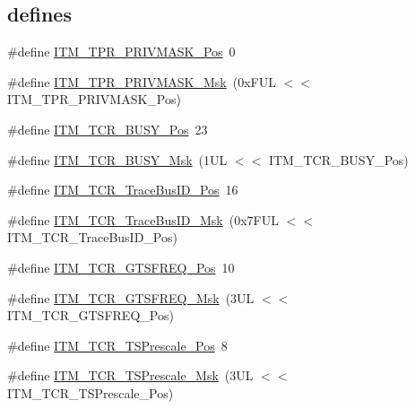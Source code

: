 \subsection*{defines}
\begin{DoxyCompactItemize}
\item 
\#define \mbox{\hyperlink{group___c_m_s_i_s___i_t_m_ga7abe5e590d1611599df87a1884a352e8}{I\+T\+M\+\_\+\+T\+P\+R\+\_\+\+P\+R\+I\+V\+M\+A\+S\+K\+\_\+\+Pos}}~0
\item 
\#define \mbox{\hyperlink{group___c_m_s_i_s___i_t_m_ga168e089d882df325a387aab3a802a46b}{I\+T\+M\+\_\+\+T\+P\+R\+\_\+\+P\+R\+I\+V\+M\+A\+S\+K\+\_\+\+Msk}}~(0x\+F\+U\+L $<$$<$ I\+T\+M\+\_\+\+T\+P\+R\+\_\+\+P\+R\+I\+V\+M\+A\+S\+K\+\_\+\+Pos)
\item 
\#define \mbox{\hyperlink{group___c_m_s_i_s___i_t_m_ga9174ad4a36052c377cef4e6aba2ed484}{I\+T\+M\+\_\+\+T\+C\+R\+\_\+\+B\+U\+S\+Y\+\_\+\+Pos}}~23
\item 
\#define \mbox{\hyperlink{group___c_m_s_i_s___i_t_m_ga43ad7cf33de12f2ef3a412d4f354c60f}{I\+T\+M\+\_\+\+T\+C\+R\+\_\+\+B\+U\+S\+Y\+\_\+\+Msk}}~(1\+U\+L $<$$<$ I\+T\+M\+\_\+\+T\+C\+R\+\_\+\+B\+U\+S\+Y\+\_\+\+Pos)
\item 
\#define \mbox{\hyperlink{group___c_m_s_i_s___i_t_m_gaca0281de867f33114aac0636f7ce65d3}{I\+T\+M\+\_\+\+T\+C\+R\+\_\+\+Trace\+Bus\+I\+D\+\_\+\+Pos}}~16
\item 
\#define \mbox{\hyperlink{group___c_m_s_i_s___i_t_m_ga60c20bd9649d1da5a2be8e656ba19a60}{I\+T\+M\+\_\+\+T\+C\+R\+\_\+\+Trace\+Bus\+I\+D\+\_\+\+Msk}}~(0x7\+F\+U\+L $<$$<$ I\+T\+M\+\_\+\+T\+C\+R\+\_\+\+Trace\+Bus\+I\+D\+\_\+\+Pos)
\item 
\#define \mbox{\hyperlink{group___c_m_s_i_s___i_t_m_ga96c7c7cbc0d98426c408090b41f583f1}{I\+T\+M\+\_\+\+T\+C\+R\+\_\+\+G\+T\+S\+F\+R\+E\+Q\+\_\+\+Pos}}~10
\item 
\#define \mbox{\hyperlink{group___c_m_s_i_s___i_t_m_gade862cf009827f7f6748fc44c541b067}{I\+T\+M\+\_\+\+T\+C\+R\+\_\+\+G\+T\+S\+F\+R\+E\+Q\+\_\+\+Msk}}~(3\+U\+L $<$$<$ I\+T\+M\+\_\+\+T\+C\+R\+\_\+\+G\+T\+S\+F\+R\+E\+Q\+\_\+\+Pos)
\item 
\#define \mbox{\hyperlink{group___c_m_s_i_s___i_t_m_gad7bc9ee1732032c6e0de035f0978e473}{I\+T\+M\+\_\+\+T\+C\+R\+\_\+\+T\+S\+Prescale\+\_\+\+Pos}}~8
\item 
\#define \mbox{\hyperlink{group___c_m_s_i_s___i_t_m_ga7a723f71bfb0204c264d8dbe8cc7ae52}{I\+T\+M\+\_\+\+T\+C\+R\+\_\+\+T\+S\+Prescale\+\_\+\+Msk}}~(3\+U\+L $<$$<$ I\+T\+M\+\_\+\+T\+C\+R\+\_\+\+T\+S\+Prescale\+\_\+\+Pos)
\item 
$$
\end{DoxyCompactItemize}
